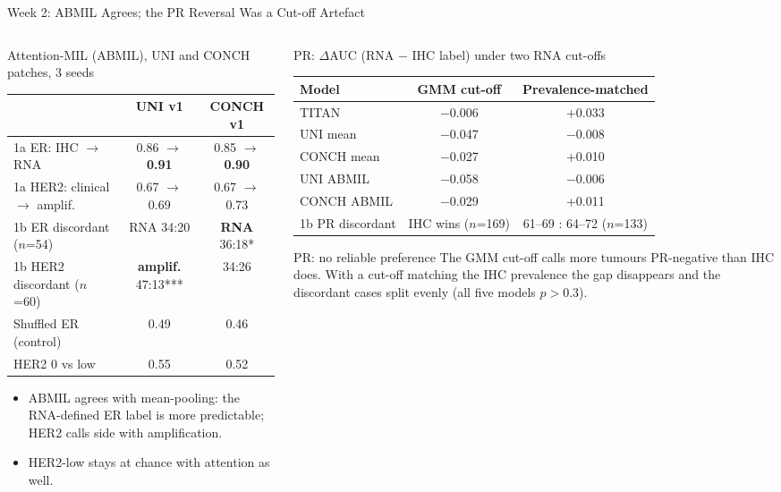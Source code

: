 \documentclass[aspectratio=169,10pt]{beamer}
\begin{document}
\begin{frame}[t]{Week 2: ABMIL Agrees; the PR Reversal Was a Cut-off Artefact}
\footnotesize
\begin{columns}[T]
\begin{column}{0.47\textwidth}
\begin{block}{Attention-MIL (ABMIL), UNI and CONCH patches, 3 seeds}
\centering
\scriptsize
\begin{tabular}{lcc}
\toprule
 & UNI v1 & CONCH v1 \\
\midrule
1a ER: IHC $\rightarrow$ RNA & 0.86 $\rightarrow$ \textbf{0.91} & 0.85 $\rightarrow$ \textbf{0.90} \\
1a HER2: clinical $\rightarrow$ amplif. & 0.67 $\rightarrow$ 0.69 & 0.67 $\rightarrow$ 0.73 \\
1b ER discordant ($n$=54) & RNA 34:20 & \textbf{RNA} 36:18* \\
1b HER2 discordant ($n$=60) & \textbf{amplif.} 47:13*** & 34:26 \\
Shuffled ER (control) & 0.49 & 0.46 \\
HER2 0 vs low & 0.55 & 0.52 \\
\bottomrule
\end{tabular}
\end{block}
\begin{itemize}
  \item ABMIL agrees with mean-pooling: the RNA-defined ER label is more predictable; HER2 calls side with amplification.
  \item HER2-low stays at chance with attention as well.
\end{itemize}
\end{column}
\begin{column}{0.50\textwidth}
\begin{block}{PR: $\Delta$AUC (RNA $-$ IHC label) under two RNA cut-offs}
\centering
\scriptsize
\begin{tabular}{lcc}
\toprule
Model & GMM cut-off & Prevalence-matched \\
\midrule
TITAN & $-$0.006 & +0.033 \\
UNI mean & $-$0.047 & $-$0.008 \\
CONCH mean & $-$0.027 & +0.010 \\
UNI ABMIL & $-$0.058 & $-$0.006 \\
CONCH ABMIL & $-$0.029 & +0.011 \\
\midrule
1b PR discordant & IHC wins ($n$=169) & 61--69 : 64--72 ($n$=133) \\
\bottomrule
\end{tabular}
\end{block}
\begin{alertblock}{PR: no reliable preference}
The GMM cut-off calls more tumours PR-negative than IHC does. With a cut-off matching the IHC prevalence the
gap disappears and the discordant cases split evenly (all five models $p > 0.3$).
\end{alertblock}
\end{column}
\end{columns}
\end{frame}
\end{document}
